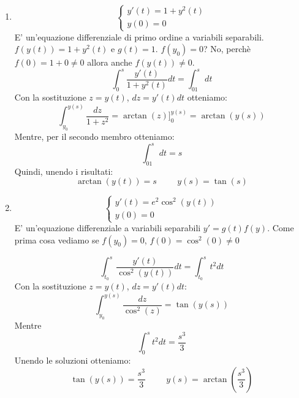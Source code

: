 \begin{exercise}
\begin{enumerate}
    \item \begin{equation*}\begin{cases}y'(t)=1+y^2(t)\\y(0)=0\end{cases}\end{equation*}
    E' un'equazione differenziale di primo ordine a variabili separabili. $f(y(t))=1+y^2(t)$ e $g(t)=1$. $f(y_0)=0$? No, perchè $f(0)=1+0\neq0$ allora anche $f(y(t))\neq0$.
    \begin{equation*}\int^s_0\frac{y'(t)}{1+y^2(t)}dt=\int^s_01dt\end{equation*}
    Con la sostituzione $z=y(t)$, $dz=y'(t)dt$ otteniamo:
    \begin{equation*}\int^{y(s)}_{y_0}\frac{dz}{1+z^2}=\arctan(z)]^{y(s)}_0=\arctan(y(s))\end{equation*}
    Mentre, per il secondo membro otteniamo:
    \begin{equation*}\int^s_01dt=s\end{equation*}
    Quindi, unendo i risultati:
    \begin{equation*}\arctan(y(t))=s\hspace{1cm}y(s)=\tan(s)\end{equation*}
    
    \item \begin{equation*}\begin{cases}y'(t)=e^2\cos^2(y(t))\\y(0)=0\end{cases}\end{equation*}
    E' un'equazione differenziale a variabili separabili $y'=g(t)f(y)$. Come prima cosa vediamo se $f(y_0)=0$, $f(0)=\cos^2(0)\neq0$
    
    \begin{equation*}
        \int^s_{t_0}\frac{y'(t)}{\cos^2(y(t))}dt=\int^s_{t_0}t^2dt
    \end{equation*}
    Con la sostituzione $z=y(t)$, $dz=y'(t)dt$:
    \begin{equation*}
        \int^{y(s)}_{y_0}\frac{dz}{\cos^2(z)}=\tan(y(s))
    \end{equation*}
    Mentre
    \begin{equation*}
        \int^s_0t^2dt=\frac{s^3}{3}
    \end{equation*}
    Unendo le soluzioni otteniamo:
    \begin{equation*}
        \tan(y(s))=\frac{s^3}{3}\hspace{1cm}y(s)=\arctan(\frac{s^3}{3})
    \end{equation*}
\end{enumerate}
\end{exercise}

